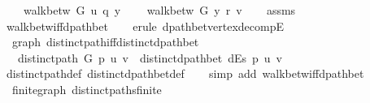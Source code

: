 \begin{isabellebody}
\ \ \ \ {\isachardoublequoteopen}walk{\isacharunderscore}{\kern0pt}betw\ G\ u\ q\ y{\isachardoublequoteclose}\isanewline
\ \ \ \ {\isachardoublequoteopen}walk{\isacharunderscore}{\kern0pt}betw\ G\ y\ r\ v{\isachardoublequoteclose}%
\endisataginvisible
{\isafoldinvisible}%
%
\isadeliminvisible
\isanewline
%
\endisadeliminvisible
%
\isadelimproof
\ \ %
\endisadelimproof
%
\isatagproof
{}\isamarkupfalse%
\ assms\isanewline
\ \ \isamarkupfalse%
\ walk{\isacharunderscore}{\kern0pt}betw{\isacharunderscore}{\kern0pt}iff{\isacharunderscore}{\kern0pt}dpath{\isacharunderscore}{\kern0pt}bet\isanewline
\ \ \isamarkupfalse%
\ {\isacharparenleft}{\kern0pt}erule\ dpath{\isacharunderscore}{\kern0pt}bet{\isacharunderscore}{\kern0pt}vertex{\isacharunderscore}{\kern0pt}decompE{\isacharparenright}{\kern0pt}%
\endisatagproof
{\isafoldproof}%
%
\isadelimproof
\isanewline
%
\endisadelimproof
%
\isadeliminvisible
\isanewline
%
\endisadeliminvisible
%
\isataginvisible
{}\isamarkupfalse%
\ {\isacharparenleft}{\kern0pt}\ graph{\isacharparenright}{\kern0pt}\ distinct{\isacharunderscore}{\kern0pt}path{\isacharunderscore}{\kern0pt}iff{\isacharunderscore}{\kern0pt}distinct{\isacharunderscore}{\kern0pt}dpath{\isacharunderscore}{\kern0pt}bet{\isacharcolon}{\kern0pt}\isanewline
\ \ \ {\isachardoublequoteopen}distinct{\isacharunderscore}{\kern0pt}path\ G\ p\ u\ v\ {\isasymlongleftrightarrow}\ distinct{\isacharunderscore}{\kern0pt}dpath{\isacharunderscore}{\kern0pt}bet\ dEs\ p\ u\ v{\isachardoublequoteclose}%
\endisataginvisible
{\isafoldinvisible}%
%
\isadeliminvisible
\isanewline
%
\endisadeliminvisible
%
\isadelimproof
\ \ %
\endisadelimproof
%
\isatagproof
{}\isamarkupfalse%
\ distinct{\isacharunderscore}{\kern0pt}path{\isacharunderscore}{\kern0pt}def\ distinct{\isacharunderscore}{\kern0pt}dpath{\isacharunderscore}{\kern0pt}bet{\isacharunderscore}{\kern0pt}def\isanewline
\ \ \isamarkupfalse%
\ {\isacharparenleft}{\kern0pt}simp\ add{\isacharcolon}{\kern0pt}\ walk{\isacharunderscore}{\kern0pt}betw{\isacharunderscore}{\kern0pt}iff{\isacharunderscore}{\kern0pt}dpath{\isacharunderscore}{\kern0pt}bet{\isacharparenright}{\kern0pt}%
\endisatagproof
{\isafoldproof}%
%
\isadelimproof
\isanewline
%
\endisadelimproof
%
\isadeliminvisible
\isanewline
%
\endisadeliminvisible
%
\isataginvisible
{}\isamarkupfalse%
\ {\isacharparenleft}{\kern0pt}\ finite{\isacharunderscore}{\kern0pt}graph{\isacharparenright}{\kern0pt}\ distinct{\isacharunderscore}{\kern0pt}paths{\isacharunderscore}{\kern0pt}finite{\isacharcolon}{\kern0pt}\isanewline

\end{isabellebody}
